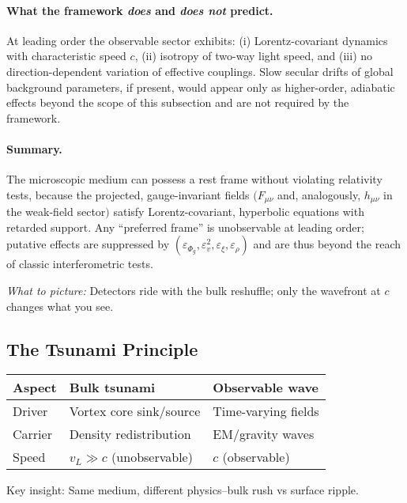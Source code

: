 \paragraph{What the framework \emph{does} and \emph{does not} predict.}
At leading order the observable sector exhibits: (i) Lorentz-covariant dynamics with characteristic speed $c$, (ii) isotropy of two-way light speed, and (iii) no direction-dependent variation of effective couplings. Slow secular drifts of global background parameters, if present, would appear only as higher-order, adiabatic effects beyond the scope of this subsection and are not required by the framework.

\paragraph{Summary.}
The microscopic medium can possess a rest frame without violating relativity tests, because the projected, gauge-invariant fields $(F_{\mu\nu}$ and, analogously, $h_{\mu\nu}$ in the weak-field sector$)$ satisfy Lorentz-covariant, hyperbolic equations with retarded support. Any ``preferred frame'' is unobservable at leading order; putative effects are suppressed by $(\varepsilon_{\Phi_g},\varepsilon_v^2,\varepsilon_\xi,\varepsilon_\rho)$ and are thus beyond the reach of classic interferometric tests.

\textit{What to picture:} Detectors ride with the bulk reshuffle; only the wavefront at $c$ changes what you see.

\subsection{The Tsunami Principle}

\begin{tcolorbox}[title=Tsunami dictionary,colback=gray!5,colframe=gray!35!black]
\begin{center}
\begin{tabular}{|l|l|l|}
\hline
\textbf{Aspect} & \textbf{Bulk tsunami} & \textbf{Observable wave} \\
\hline
Driver & Vortex core sink/source & Time-varying fields \\
Carrier & Density redistribution & EM/gravity waves \\
Speed & $v_L \gg c$ (unobservable) & $c$ (observable) \\
\hline
\end{tabular}
\end{center}
Key insight: Same medium, different physics--bulk rush vs surface ripple.
\end{tcolorbox}


